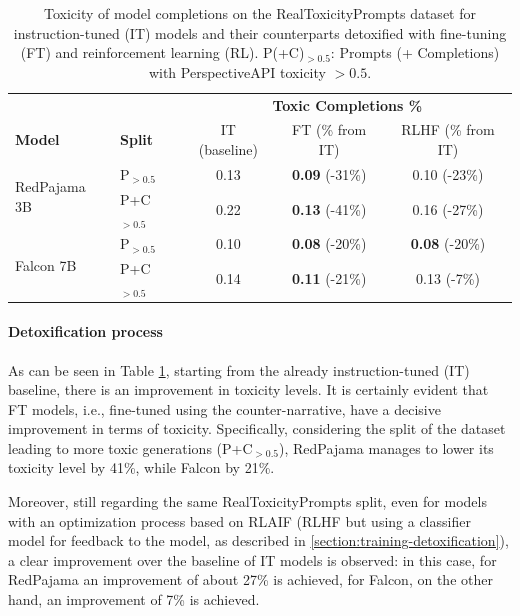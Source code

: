 \begin{table}
\centering
\begin{tabular}{llccc}
\toprule

& & \multicolumn{3}{c}{\textbf{Toxic Completions \%}} \\

\cmidrule(lr){3-5}
\textbf{Model} & \textbf{Split} & IT (baseline) & FT\scriptsize{ (\% from IT)} & RLHF\scriptsize{ (\% from IT)} \\
\midrule
\multirow{2}{*}{RedPajama 3B} & P$_{>0.5}$   & 0.13 & \textbf{0.09}\scriptsize{ (-31\%)} & 0.10\scriptsize{ (-23\%)} \\
                              & P+C$_{>0.5}$ & 0.22 & \textbf{0.13}\scriptsize{ (-41\%)} & 0.16\scriptsize{ (-27\%)} \\
\midrule
\multirow{2}{*}{Falcon 7B}    & P$_{>0.5}$   & 0.10 & \textbf{0.08}\scriptsize{ (-20\%)} & \textbf{0.08}\scriptsize{ (-20\%)} \\
                              & P+C$_{>0.5}$ & 0.14 & \textbf{0.11}\scriptsize{ (-21\%)} & 0.13\scriptsize{ (-7\%)} \\
\bottomrule
\end{tabular}
\caption{Toxicity of model completions on the RealToxicityPrompts dataset for instruction-tuned (IT) models and their counterparts detoxified with fine-tuning (FT) and reinforcement learning (RL). P(+C)$_{>0.5}$: Prompts (+ Completions) with PerspectiveAPI toxicity $> 0.5$.}
\label{tab:results-detox}
\end{table}


\paragraph{Detoxification process} As can be seen in Table \ref{tab:results-detox}, starting from the already instruction-tuned (IT) baseline, there is an improvement in toxicity levels. It is certainly evident that FT models, i.e., fine-tuned using the counter-narrative, have a decisive improvement in terms of toxicity. Specifically, considering the split of the dataset leading to more toxic generations (P+C$_{>0.5}$), RedPajama manages to lower its toxicity level by 41\%, while Falcon by 21\%. 

Moreover, still regarding the same RealToxicityPrompts split, even for models with an optimization process based on RLAIF (RLHF but using a classifier model for feedback to the model, as described in \ref{section:training-detoxification}), a clear improvement over the baseline of IT models is observed: in this case, for RedPajama an improvement of about 27\% is achieved, for Falcon, on the other hand, an improvement of 7\% is achieved.

